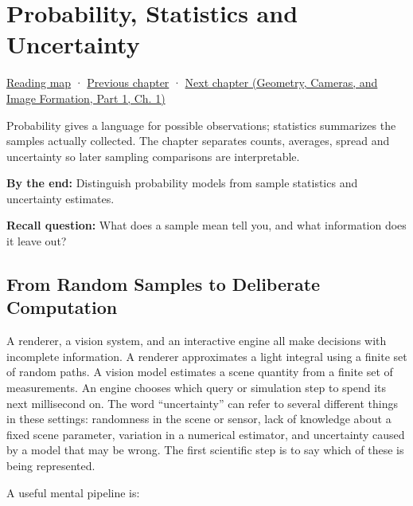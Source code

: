 \chapter{Probability, Statistics and Uncertainty}\label{03-visual-computing-i-ch012-probability-statistics-and-uncertainty}\hypertarget{03-visual-computing-i-ch012}{}\label{stagechapter:03-visual-computing-i-ch012}

\hypertarget{03-visual-computing-i-ch012-probability-statistics-and-uncertainty}{}

\hyperref[volume-reading-map]{Reading map} · \hyperref[02-foundations-ii-ch031]{Previous chapter} · \href{../03-Geometry-Cameras-and-Image-Formation-P01/main.pdf\#02-foundations-ii-ch032}{Next chapter (Geometry, Cameras, and Image Formation, Part 1, Ch. 1)}

Probability gives a language for possible observations; statistics summarizes the samples actually collected. The chapter separates counts, averages, spread and uncertainty so later sampling comparisons are interpretable.

\textbf{By the end:} Distinguish probability models from sample statistics and uncertainty estimates.

\textbf{Recall question:} What does a sample mean tell you, and what information does it leave out?

\section{From Random Samples to Deliberate Computation}\label{03-visual-computing-i-ch012-from-random-samples-to-deliberate-computation}

\hypertarget{03-visual-computing-i-ch012-from-random-samples-to-deliberate-computation}{}

A renderer, a vision system, and an interactive engine all make decisions with incomplete information. A renderer approximates a light integral using a finite set of random paths. A vision model estimates a scene quantity from a finite set of measurements. An engine chooses which query or simulation step to spend its next millisecond on. The word ``uncertainty'' can refer to several different things in these settings: randomness in the scene or sensor, lack of knowledge about a fixed scene parameter, variation in a numerical estimator, and uncertainty caused by a model that may be wrong. The first scientific step is to say which of these is being represented.

A useful mental pipeline is:


